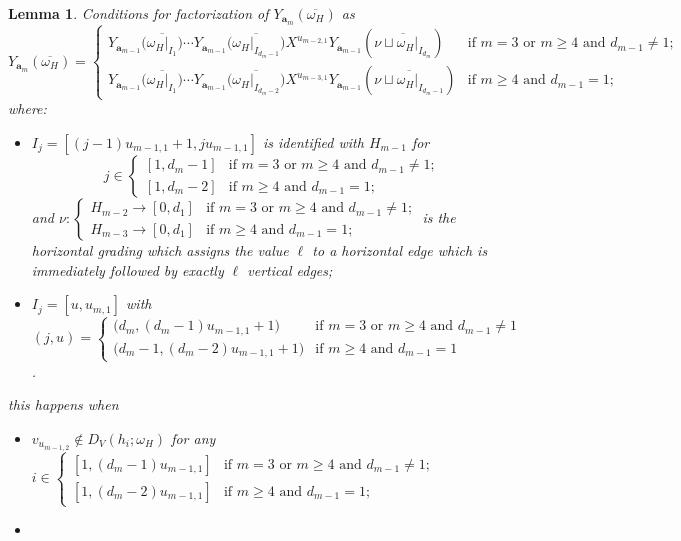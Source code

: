 \documentclass{amsart}
\newtheorem{lemma}[theorem]{Lemma}
\newcommand{\bfa}{\mathbf{a}}
\begin{document}
\begin{lemma}
  Conditions for factorization of $Y_{\bfa_m}(\overline{\omega_H})$ as
  \[Y_{\bfa_m}(\overline{\omega_H})=\begin{cases}Y_{\bfa_{m-1}}\Big(\overline{\omega_H|_{I_1}}\Big)\cdots Y_{\bfa_{m-1}}\Big(\overline{\omega_H|_{I_{d_m-1}}}\Big)X^{u_{m-2,1}}Y_{\bfa_{m-1}}(\overline{\nu\sqcup\omega_H|_{I_{d_m}}}) & \text{if $m=3$ or $m\ge 4$ and $d_{m-1}\ne 1$;}\\ Y_{\bfa_{m-1}}\Big(\overline{\omega_H|_{I_1}}\Big)\cdots Y_{\bfa_{m-1}}\Big(\overline{\omega_H|_{I_{d_m-2}}}\Big)X^{u_{m-3,1}}Y_{\bfa_{m-1}}(\overline{\nu\sqcup\omega_H|_{I_{d_m-1}}}) & \text{if $m\ge 4$ and $d_{m-1}=1$;}\end{cases}\]
  where:
  \begin{itemize}
    \item $I_j=[(j-1)u_{m-1,1}+1,ju_{m-1,1}]$ is identified with $H_{m-1}$ for 
    \[j\in\begin{cases}[1,d_m-1] & \text{if $m=3$ or $m\ge 4$ and $d_{m-1}\ne 1$;}\\ [1,d_m-2] & \text{if $m\ge 4$ and $d_{m-1}=1$;}\end{cases}\]
    and $\nu:\begin{cases}H_{m-2}\to[0,d_1] & \text{if $m=3$ or $m\ge 4$ and $d_{m-1}\ne 1$;}\\ H_{m-3}\to[0,d_1] & \text{if $m\ge 4$ and $d_{m-1}=1$;}\end{cases}$ is the horizontal grading which assigns the value $\ell$ to a horizontal edge which is immediately followed by exactly $\ell$ vertical edges;
    \item $I_j=[u,u_{m,1}]$ with $(j,u)=\begin{cases}\big(d_m,(d_m-1)u_{m-1,1}+1\big) & \text{if $m=3$ or $m\ge 4$ and $d_{m-1}\ne 1$}\\\big(d_m-1,(d_m-2)u_{m-1,1}+1\big) & \text{if $m\ge 4$ and $d_{m-1}=1$}\end{cases}$.
  \end{itemize}
  this happens when
  \begin{itemize}
    \item $v_{u_{m-1,2}}\notin D_V(h_i;\omega_H)$ for any $i\in\begin{cases}[1,(d_m-1)u_{m-1,1}] & \text{if $m=3$ or $m\ge 4$ and $d_{m-1}\ne 1$;}\\ [1,(d_m-2)u_{m-1,1}] & \text{if $m\ge 4$ and $d_{m-1}=1$;}\end{cases}$
    \item 
  \end{itemize}
\end{lemma}
\end{document}
